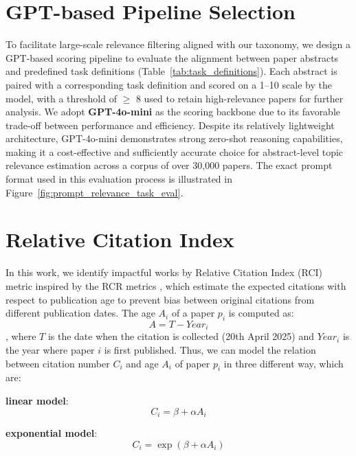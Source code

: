 \documentclass[manuscript,screen]{acmart}
\begin{document}
\section{GPT-based Pipeline Selection}
\label{app:relevance_scoring}
To facilitate large-scale relevance filtering aligned with our taxonomy, we design a GPT-based scoring pipeline to evaluate the alignment between paper abstracts and predefined task definitions (Table~\ref{tab:task_definitions}). Each abstract is paired with a corresponding task definition and scored on a 1–10 scale by the model, with a threshold of $\geq$ 8 used to retain high-relevance papers for further analysis. We adopt \textbf{GPT-4o-mini} as the scoring backbone due to its favorable trade-off between performance and efficiency. Despite its relatively lightweight architecture, GPT-4o-mini demonstrates strong zero-shot reasoning capabilities, making it a cost-effective and sufficiently accurate choice for abstract-level topic relevance estimation across a corpus of over 30,000 papers. The exact prompt format used in this evaluation process is illustrated in Figure~\ref{fig:prompt_relevance_task_eval}.

\section{Relative Citation Index}
\label{rel_citation_indx}
In this work, we identify impactful works by Relative Citation Index (RCI) metric inspired by the RCR metrics \citep{10.1371/journal.pbio.1002541}, which estimate the expected citations with respect to publication age to prevent bias between original citations from different publication dates. The age $A_i$ of a paper $p_i$ is computed as:
\begin{equation}
    A = T - Year_i 
\end{equation}
, where $T$ is the date when the citation is collected (20th April 2025) and $Year_i$ is the year where paper $i$ is first published. Thus, we can model the relation between citation number $C_i$ and age $A_i$ of paper $p_i$ in three different way, which are:

\textbf{linear model}: 
\begin{equation}
    C_i = \beta + \alpha A_i
\end{equation}

\textbf{exponential model}: 
\begin{equation}
    C_i = \exp(\beta + \alpha A_i)
\end{equation}
\end{document}
